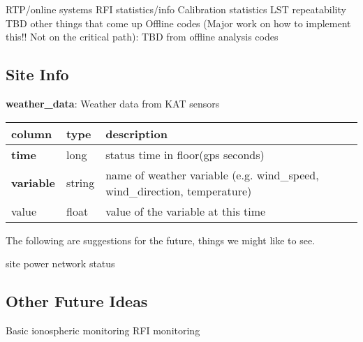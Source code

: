 \documentclass{article}
\begin{document}
\begin{outline}[enumerate]
	\1 RTP/online systems
		\2 RFI statistics/info
		\2 Calibration statistics
		\2 LST repeatability
		\2 TBD other things that come up
	\1 Offline codes (Major work on how to implement this!! Not on the critical path):
		\2 TBD from offline analysis codes
\end{outline}

\subsection{Site Info}

\textbf{\large{weather\_data}}: Weather data from KAT sensors
\begin{center}
 \begin{tabular}{| p{4cm} | p{2cm} | p{10cm} |} 
\hline
 column & type & description \\ [0.5ex]  \hline\hline
\textbf{time} & long & status time in floor(gps seconds)\\ \hline
\textbf{variable} & string & name of weather variable (e.g. wind\_speed,  wind\_direction, temperature) \\ \hline
value & float & value of the variable at this time \\\hline
\end{tabular}
\end{center}

The following are suggestions for the future, things we might like to see.
\begin{outline}[enumerate]
	\1 site power
	\1 network status
\end{outline}

\subsection{Other Future Ideas}
\begin{outline}[enumerate]
	\1 Basic ionospheric monitoring
	\1 RFI monitoring
\end{outline}
\end{document}
